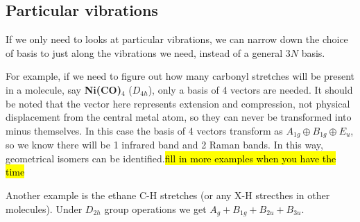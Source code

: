 \subsection{Particular vibrations}
If we only need to looks at particular vibrations, we can narrow down the choice of basis to just along the vibrations we need, instead of a general $3N$ basis. \par
For example, if we need to figure out how many carbonyl stretches will be present in a molecule, say \textbf{Ni(CO)$_4$} ($D_{4h}$), only a basis of 4 vectors are needed. It should be noted that the vector here represents extension and compression, not physical displacement from the central metal atom, so they can never be transformed into minus themselves. 
In this case the basis of 4 vectors transform as $A_{1g}\oplus B_{1g}\oplus E_u$, so we know there will be 1 infrared band and 2 Raman bands. 
In this way, geometrical isomers can be identified.\hl{fill in more examples when you have the time}\par
Another example is the ethane C-H stretches (or any X-H strecthes in other molecules). Under $D_{2h}$ group operations we get $A_g+B_{1g}+B_{2u}+B_{3u}$.
